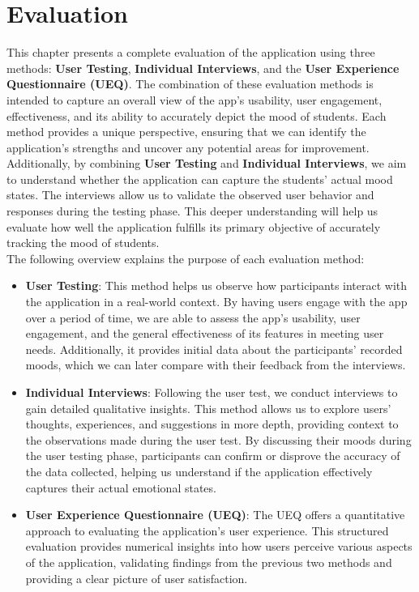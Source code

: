\chapter{Evaluation}

This chapter presents a complete evaluation of the application using three methods: \textbf{User Testing}, \textbf{Individual Interviews}, and the \textbf{User Experience Questionnaire (UEQ)}. The combination of these evaluation methods is intended to capture an overall view of the app’s usability, user engagement, effectiveness, and its ability to accurately depict the mood of students. Each method provides a unique perspective, ensuring that we can identify the application’s strengths and uncover any potential areas for improvement.\vspace{5mm} \\
Additionally, by combining \textbf{User Testing} and \textbf{Individual Interviews}, we aim to understand whether the application can capture the students' actual mood states. The interviews allow us to validate the observed user behavior and responses during the testing phase. This deeper understanding will help us evaluate how well the application fulfills its primary objective of accurately tracking the mood of students.\vspace{5mm} \\
The following overview explains the purpose of each evaluation method:

\begin{itemize}
    \item \textbf{User Testing}: This method helps us observe how participants interact with the application in a real-world context. By having users engage with the app over a period of time, we are able to assess the app’s usability, user engagement, and the general effectiveness of its features in meeting user needs. Additionally, it provides initial data about the participants' recorded moods, which we can later compare with their feedback from the interviews.

    \item \textbf{Individual Interviews}: Following the user test, we conduct interviews to gain detailed qualitative insights. This method allows us to explore users’ thoughts, experiences, and suggestions in more depth, providing context to the observations made during the user test. By discussing their moods during the user testing phase, participants can confirm or disprove the accuracy of the data collected, helping us understand if the application effectively captures their actual emotional states.

    \item \textbf{User Experience Questionnaire (UEQ)}: The UEQ offers a quantitative approach to evaluating the application’s user experience. This structured evaluation provides numerical insights into how users perceive various aspects of the application, validating findings from the previous two methods and providing a clear picture of user satisfaction.
\end{itemize}

